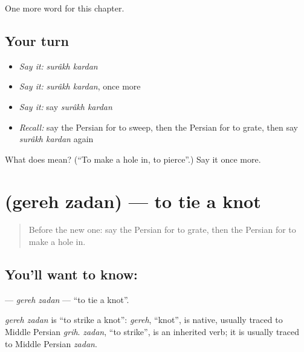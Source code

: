 \begin{grammarlens}[title={What you've built}]
One more word for this chapter.
\end{grammarlens}

\subsection*{Your turn}
\begin{itemize}
\raggedright
  \item \emph{Say it:} \emph{surâkh kardan}
  \item \emph{Say it:} \emph{surâkh kardan}, once more
  \item \emph{Say it:} say \emph{surâkh kardan}
  \item \emph{Recall:} say the Persian for to sweep, then the Persian for to grate, then say \emph{surâkh kardan} again
\end{itemize}

\begin{tcolorbox}[breakable,colback=teal!4,colframe=teal!35!black,title={Before you move on}]
What does   mean? (\textquotedblleft{}To make a hole in, to pierce\textquotedblright{}.) Say it once more.
\end{tcolorbox}
\section[\texorpdfstring{\fa{گره} \fa{زدن} (gereh zadan)}{گره زدن (gereh zadan)}]{  (gereh zadan) — to tie a knot}

\label{lesson:FA-C260-gereh-zadan}



\begin{quote}
Before the new one: say the Persian for to grate, then the Persian for to make a hole in.
\end{quote}

\subsection*{You'll want to know:  }
\textbf{ } — \emph{gereh zadan} — \textquotedblleft{}to tie a knot\textquotedblright{}.

\begin{cousinweb}
\emph{gereh zadan} is \textquotedblleft{}to strike a knot\textquotedblright{}: \emph{gereh}, \textquotedblleft{}knot\textquotedblright{}, is native, usually traced to Middle Persian \emph{grih}. \emph{zadan}, \textquotedblleft{}to strike\textquotedblright{}, is an inherited verb; it is usually traced to Middle Persian \emph{zadan}.
\end{cousinweb}

